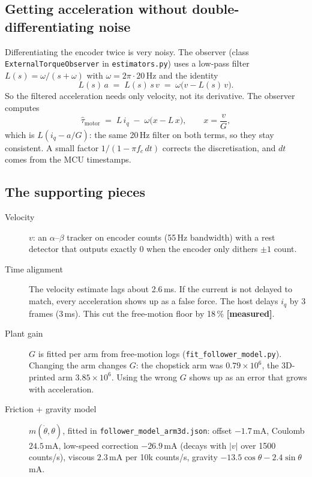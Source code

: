 \documentclass[11pt,a4paper]{article}
\newcommand{\iq}{i_q}
\newcommand{\mA}{\,\mathrm{mA}}
\newcommand{\file}[1]{\texttt{#1}}
\newcommand{\measured}{\textcolor{teal!70!black}{\textbf{[measured]}}}
\begin{document}
\subsection{Getting acceleration without double-differentiating noise}

Differentiating the encoder twice is very noisy. The observer (class
\file{ExternalTorqueObserver} in \file{estimators.py}) uses a low-pass filter
$L(s) = \omega/(s+\omega)$ with $\omega = 2\pi\cdot20\,\mathrm{Hz}$ and
the identity
\begin{equation}
  L(s)\,a \;=\; L(s)\,s\,v \;=\; \omega\bigl(v - L(s)\,v\bigr).
\end{equation}
So the filtered acceleration needs only velocity, not its derivative. The
observer computes
\begin{equation}
  \hat\tau_{\mathrm{motor}} \;=\; L\,\iq \;-\; \omega\bigl(x - L\,x\bigr),
  \qquad x = \frac{v}{G},
\end{equation}
which is $L(\iq - a/G)$: the same 20\,Hz filter on both terms, so they
stay consistent. A small factor
$1/(1-\pi f_c\,dt)$ corrects the discretisation, and $dt$ comes from the
MCU timestamps.

\subsection{The supporting pieces}

\begin{description}
  \item[Velocity] $v$: an $\alpha$--$\beta$ tracker on encoder counts
        (55\,Hz bandwidth) with a rest detector that outputs exactly 0
        when the encoder only dithers $\pm1$ count.
  \item[Time alignment] The velocity estimate lags about 2.6\,ms. If the
        current is not delayed to match, every acceleration shows up as a
        false force. The host delays $\iq$ by 3 frames (3\,ms). This cut
        the free-motion floor by 18\,\% \measured.
  \item[Plant gain] $G$ is fitted per arm from free-motion logs
        (\file{fit\_follower\_model.py}). Changing the arm changes $G$: the
        chopstick arm was $0.79\times10^6$, the 3D-printed arm
        $3.85\times10^6$. Using the wrong $G$ shows up as an error that
        grows with acceleration.
  \item[Friction + gravity model] $m(\dot\theta,\theta)$, fitted in
        \file{follower\_model\_arm3d.json}:
        offset $-1.7\mA$, Coulomb $24.5\mA$, low-speed correction
        $-26.9\mA$ (decays with $|v|$ over 1500 counts/s), viscous
        $2.3\mA$ per 10k counts/s, gravity $-13.5\cos\theta - 2.4\sin\theta$\,mA.
\end{description}
\end{document}
